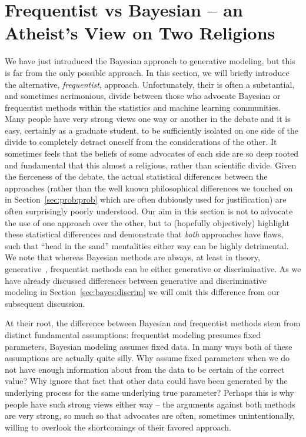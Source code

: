
\section{Frequentist vs Bayesian -- an Atheist's View on Two Religions}
\label{sec:bayes:religions}

We have just introduced the Bayesian approach to generative modeling, but this is far from
the only possible approach.  In this section, we will briefly introduce the alternative, \emph{frequentist},
approach.
  Unfortunately, their is often a substantial, and sometimes acrimonious, divide between those
who advocate Bayesian or frequentist methods within the statistics and machine learning communities.  Many people
have very strong views one way or another in the debate and it is easy, certainly as a graduate student,
to be sufficiently isolated on one side of the divide to completely detract oneself from the considerations of the
other.  It sometimes feels that the beliefs of some advocates of each side are so deep rooted and 
fundamental that this almost a religious, rather than scientific divide.  Given the fierceness of the debate,
the actual statistical differences between the approaches (rather than the well known philosophical differences we touched
on in Section~\ref{sec:prob:prob} which are often dubiously used for justification) are often surprisingly poorly understood.
Our aim in this section is not to advocate the use of one approach over the other, but to (hopefully objectively)
highlight these statistical differences and demonstrate that \emph{both} approaches have flaws, such that ``head in the sand''
mentalities either way can be highly detrimental.  
We note that whereas Bayesian methods are always, at least in theory, generative~\citep[Section~14.1]{gelman2014bayesian},
frequentist methods can be either generative or discriminative. 
As we have already discussed differences between generative and
discriminative modeling in Section~\ref{sec:bayes:discrim} we will omit this difference from our subsequent discussion.

At their root, the difference between Bayesian and frequentist methods stem from distinct fundamental
assumptions: frequentist modeling presumes fixed parameters, Bayesian modeling assumes fixed data.  In many ways
both of these assumptions are actually quite silly. Why assume fixed parameters when we do not have enough
information about from the data to be certain of the correct value?  Why ignore that fact that other data could have 
been generated by the underlying process for the same underlying true parameter?  Perhaps this is why people have
such strong views either way -- the arguments against both methods are very strong, so much so that advocates are
often, sometimes unintentionally, willing to overlook the shortcomings of their favored approach.  

